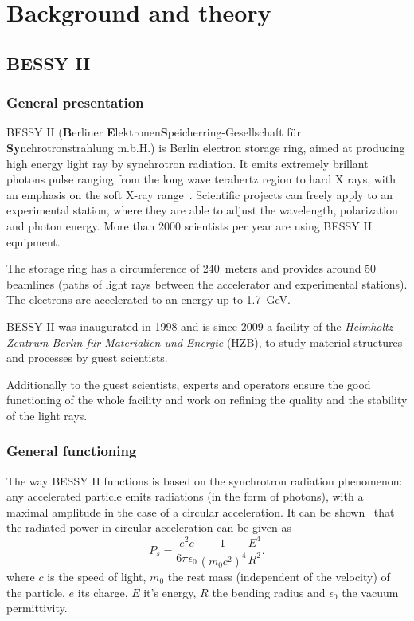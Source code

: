 
\chapter{Background and theory}
\label{sec:background}

\section{BESSY II}

\subsection{General presentation}
BESSY II (\textbf{B}erliner \textbf{E}lektronen\-\textbf{S}peicherring-Gesellschaft für \textbf{Sy}n\-chro\-tron\-strahlung m.b.H.) is Berlin electron storage ring, aimed at producing high energy light ray by synchrotron radiation. It emits extremely brillant photons pulse ranging from the long wave terahertz region to hard X rays, with an emphasis on the soft X-ray range~\cite{web:bessy_homepage}. Scientific projects can freely apply to an experimental station, where they are able to adjust the wavelength, polarization and photon energy. More than 2000 scientists per year are using BESSY II equipment.

The storage ring has a circumference of 240~meters and provides around 50 beamlines (paths of light rays between the accelerator and experimental stations). The electrons are accelerated to an energy up to 1.7~GeV.

BESSY II was inaugurated in 1998 and is since 2009 a facility of the \textit{Helmholtz-Zentrum Berlin für Materialien und Energie} (HZB), to study material structures and processes by guest scientists.

Additionally to the guest scientists, experts and operators ensure the good functioning of the whole facility and work on refining the quality and the stability of the light rays. 

\subsection{General functioning}
The way BESSY II functions is based on the synchrotron radiation phenomenon: any accelerated particle emits radiations (in the form of photons), with a maximal amplitude in the case of a circular acceleration.  It can be shown~\cite{book:wille} that the radiated power in circular acceleration can be given as 
\begin{equation}
P_s = \frac{e^2 c}{6 \pi \epsilon_0}\frac{1}{(m_0 c^2)^4}\frac{E^4}{R^2}.
\end{equation}
where $c$ is the speed of light, $m_0$ the rest mass (independent of the velocity) of the particle, $e$ its charge, $E$ it's energy, $R$ the bending radius and $\epsilon_0$ the  vacuum permittivity.

